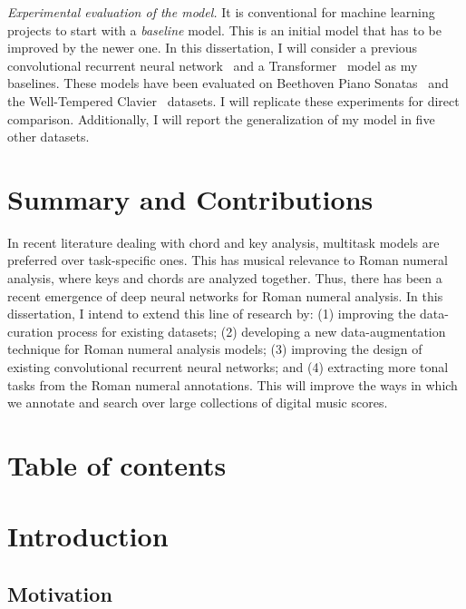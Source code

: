 \documentclass[12pt]{article}
\begin{document}
\emph{Experimental evaluation of the model.}
It is conventional for machine learning projects to start with a \emph{baseline} model.
This is an initial model that has to be improved by the newer one.
In this dissertation, I will consider a previous convolutional recurrent neural network~\cite{micchi_not_2020} and a Transformer~\cite{chen_attend_2021} model as my baselines.
These models have been evaluated on Beethoven Piano Sonatas~\cite{chen_functional_2018} and the Well-Tempered Clavier~\cite{gotham_romantext_2019} datasets.
I will replicate these experiments for direct comparison.
Additionally, I will report the generalization of my model in five other datasets.

\section*{Summary and Contributions}
In recent literature dealing with chord and key analysis, multitask models are preferred over task-specific ones.
This has musical relevance to Roman numeral analysis, where keys and chords are analyzed together.
Thus, there has been a recent emergence of deep neural networks for Roman numeral analysis.
In this dissertation, I intend to extend this line of research by:
(1) improving the data-curation process for existing datasets;
(2) developing a new data-augmentation technique for Roman numeral analysis models;
(3) improving the design of existing convolutional recurrent neural networks;
and (4) extracting more tonal tasks from the Roman numeral annotations.
This will improve the ways in which we annotate and search over large collections of digital music scores.


{\footnotesize
}

\clearpage

\tableofcontents
{}

\section*{Table of contents}
\section{Introduction}
\subsection{Motivation}
\end{document}
